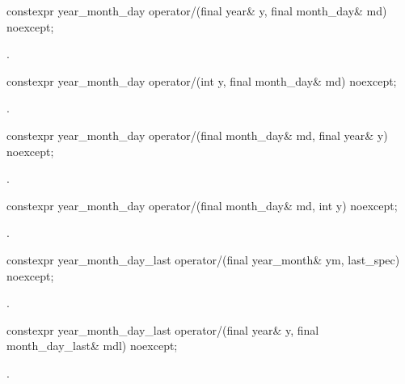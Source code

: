 \begin{itemdecl}
constexpr year_month_day
  operator/(final year& y, final month_day& md) noexcept;
\end{itemdecl}

\begin{itemdescr}
\pnum
\returns {}.
\end{itemdescr}

\begin{itemdecl}
constexpr year_month_day
  operator/(int y, final month_day& md) noexcept;
\end{itemdecl}

\begin{itemdescr}
\pnum
\returns {}.
\end{itemdescr}

\begin{itemdecl}
constexpr year_month_day
  operator/(final month_day& md, final year& y) noexcept;
\end{itemdecl}

\begin{itemdescr}
\pnum
\returns {}.
\end{itemdescr}

\begin{itemdecl}
constexpr year_month_day
  operator/(final month_day& md, int y) noexcept;
\end{itemdecl}

\begin{itemdescr}
\pnum
\returns {}.
\end{itemdescr}

\begin{itemdecl}
constexpr year_month_day_last
  operator/(final year_month& ym, last_spec) noexcept;
\end{itemdecl}

\begin{itemdescr}
\pnum
\returns {}.
\end{itemdescr}

\begin{itemdecl}
constexpr year_month_day_last
  operator/(final year& y, final month_day_last& mdl) noexcept;
\end{itemdecl}

\begin{itemdescr}
\pnum
\returns {}.
\end{itemdescr}

